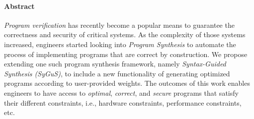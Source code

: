 \paragraph{Abstract}
\emph{Program verification} has recently become a popular means to guarantee the correctness and security of critical systems.
%
As the complexity of those systems increased, engineers started looking into \emph{Program Synthesis} to automate the process of implementing programs that are correct by construction.
%
We propose extending one such program synthesis framework, namely \emph{Syntax-Guided Synthesis (SyGuS)}, to include a new functionality of generating optimized programs according to user-provided weights.
%
The outcomes of this work enables engineers to have access to \emph{optimal}, \emph{correct}, and \emph{secure} programs that satisfy their different constraints, i.e., hardware constraints, performance constraints, etc.
